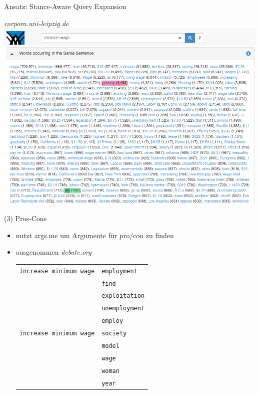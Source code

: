 \documentclass[usenames,dvipsnames]{beamer}
\begin{document}
\begin{section}{Ansatz: Stance-Aware Query Expansion}
\begin{frame}[plain]
	\hfill \small \textit{corpora.uni-leipzig.de}
	\includegraphics[width=\textwidth]{figures/corpora-minimum-wage.png}
\end{frame}

\begin{frame}{(3) Pros-Cons}
	\begin{itemize}
		\item nutzt args.me um Argumente für pro/con zu finden
		\item ausgenommen \textit{debate.org}
		\vspace{1em}
		\begin{tcolorbox}
			\begin{tabular}{l l}
				\texttt{increase minimum wage} & \texttt{\color{RubineRed}employment} \\
																			 & \texttt{\color{RubineRed}find} \\
																			 & \texttt{\color{RubineRed}exploitation} \\
																			 & \texttt{\color{RubineRed}unemployment} \\
																			 & \texttt{\color{RubineRed}employ} \\
				\texttt{increase minimum wage} & \texttt{\color{JungleGreen}society} \\
																			 & \texttt{\color{JungleGreen}model} \\
																			 & \texttt{\color{JungleGreen}wage} \\
																			 & \texttt{\color{JungleGreen}woman} \\
																			 & \texttt{\color{JungleGreen}year} \\
			\end{tabular}
		\end{tcolorbox}
	\end{itemize}
\end{frame}
\end{section}
	
\end{document}
